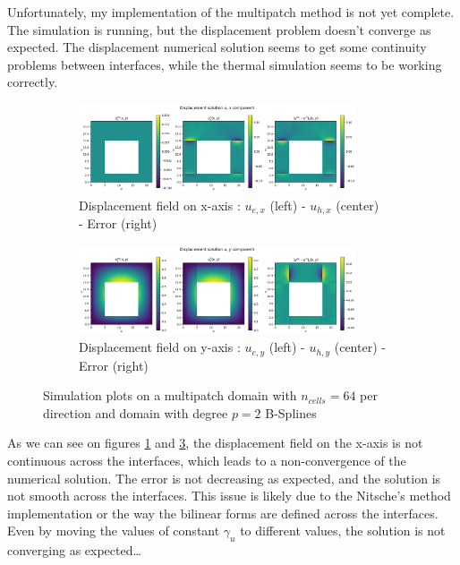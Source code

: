 \documentclass[a4paper,12pt,twoside]{report}
\begin{document}
Unfortunately, my implementation of the multipatch method is not yet complete. The simulation is running, but the displacement problem doesn't converge as expected. The displacement numerical solution seems to get some continuity problems between interfaces, while the thermal simulation seems to be working correctly.

\begin{figure}  \ContinuedFloat
	\centering
	\begin{subfigure}[b]{\textwidth}
		\centering
		\includegraphics[width=0.9\textwidth]{figures/figures_multipatch/ux.png}
		\caption{Displacement field on x-axis : $u_{e,x}$ (left) - $u_{h,x}$ (center) - Error (right)}
		\label{fig:ux_multipatch}
	\end{subfigure}
	\begin{subfigure}[b]{\textwidth}
		\centering
		\includegraphics[width=0.9\textwidth]{figures/figures_multipatch/uy.png}
		\caption{Displacement field on y-axis : $u_{e,y}$ (left) - $u_{h,y}$ (center) - Error (right)}
		\label{fig:uy_multipatch}
	\end{subfigure}
	\caption{Simulation plots on a multipatch domain with $n_{cells} = 64$ per direction and domain with degree $p = 2$ B-Splines}
\end{figure}

As we can see on figures \ref{fig:ux_multipatch} and \ref{fig:uy_multipatch}, the displacement field on the x-axis is not continuous across the interfaces, which leads to a non-convergence of the numerical solution. The error is not decreasing as expected, and the solution is not smooth across the interfaces. This issue is likely due to the Nitsche's method implementation or the way the bilinear forms are defined across the interfaces. Even by moving the values of constant $\gamma_u$ to different values, the solution is not converging as expected\dots
\end{document}
